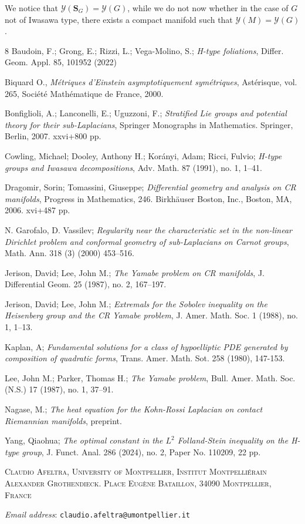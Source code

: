 \documentclass{article}
\newcommand{\ci}[1]{\mathscr{#1}}%
\theoremstyle{definition}
\theoremstyle{remark}
\begin{document}
We notice that $\ci{Y}(\bm{S}_G)=\ci{Y}(G)$, while we do not now whether in the case of $G$ not of Iwasawa type, there exists a compact manifold such that $\ci{Y}(M)=\ci{Y}(G)$.

\begin{thebibliography}{8}
  Baudoin, F.; Grong, E.; Rizzi, L.; Vega-Molino, S.;
 \textit{H-type foliations},
 Differ. Geom. Appl. 85, 101952	(2022)
 
  Biquard O.,
 \textit{Métriques d’Einstein asymptotiquement symétriques},
 Astérisque, vol. 265, Société Mathématique de France, 2000.
	
  Bonfiglioli, A.; Lanconelli, E.; Uguzzoni, F.;
 \textit{Stratified Lie groups and potential theory for their sub-Laplacians},
 Springer Monographs in Mathematics. Springer, Berlin, 2007. xxvi+800 pp.
	
  Cowling, Michael; Dooley, Anthony H.; Korányi, Adam; Ricci, Fulvio;
 \textit{H-type groups and Iwasawa decompositions},
 Adv. Math. 87 (1991), no. 1, 1–41.
 
  Dragomir, Sorin; Tomassini, Giuseppe;
 \textit{Differential geometry and analysis on CR manifolds}, Progress in Mathematics, 246. Birkhäuser Boston, Inc., Boston, MA, 2006. xvi+487 pp.
 
  N. Garofalo, D. Vassilev;
 \textit{Regularity near the characteristic set in the non-linear Dirichlet problem and conformal geometry of sub-Laplacians on Carnot groups},
 Math. Ann. 318 (3) (2000) 453–516.
	
 
  Jerison, David; Lee, John M.;
 \textit{The Yamabe problem on CR manifolds},
 J. Differential Geom. 25 (1987), no. 2, 167–197.
 
 Jerison, David; Lee, John M.;
 \textit{Extremals for the Sobolev inequality on the Heisenberg group and the CR Yamabe problem},
 J. Amer. Math. Soc. 1 (1988), no. 1, 1–13.
 
  Kaplan, A;
 \textit{Fundamental solutions for a class of hypoelliptic PDE generated by composition of quadratic forms},
 Trans. Amer. Math. Sot. 258 (1980), 147-153.
 
  Lee, John M.; Parker, Thomas H.;
 \textit{The Yamabe problem},
 Bull. Amer. Math. Soc. (N.S.) 17 (1987), no. 1, 37–91.
 
  Nagase, M.;
 \textit{The heat equation for the Kohn-Rossi Laplacian on contact Riemannian manifolds}, preprint.

  Yang, Qiaohua;
 \textit{The optimal constant in the $L^2$ Folland-Stein inequality on the H-type group},
 J. Funct. Anal. 286 (2024), no. 2, Paper No. 110209, 22 pp.
\end{thebibliography}

\textsc{Claudio Afeltra, University of Montpellier,  
	Institut Montpelliérain  Alexander Grothendieck.
	Place Eug\`ene Bataillon, 
	34090 Montpellier,  France}


\textit{Email address}:  \texttt{claudio.afeltra@umontpellier.it}
\end{document}
